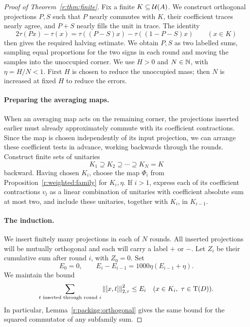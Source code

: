 \begin{proof}[Proof of Theorem~\ref{r:thm:finite}]
Fix a finite \(K\subseteq\mathcal U(A)\).
We construct orthogonal projections \(P,S\) such that \(P\) nearly commutes
with \(K\), their coefficient traces nearly agree, and \(P+S\) nearly
fills the unit in trace. The identity
\[
 2\tau(Px)-\tau(x)
 =\tau((P-S)x)-\tau((1-P-S)x)
 \qquad(x\in K)
\]
then gives the required halving estimate. We obtain \(P,S\) as two
labelled sums, sampling equal proportions for the two signs in each
round and moving the samples into the unoccupied corner.
We use \(H>0\) and \(N\in\mathbb N\), with \(\eta=H/N<1\).
First \(H\) is chosen to reduce the unoccupied mass; then \(N\) is
increased at fixed \(H\) to reduce the errors.

\paragraph{Preparing the averaging maps.}
When an averaging map acts on the remaining corner, the projections
inserted earlier must already approximately commute with its coefficient
contractions. Since the map is chosen independently of its input
projection, we can arrange these coefficient tests in advance, working
backwards through the rounds.
Construct finite sets of unitaries
\[
 K_1\supseteq K_2\supseteq\cdots\supseteq K_N=K
\]
backward. Having chosen \(K_i\), choose the map \(\Phi_i\) from
Proposition~\ref{r:weighted:family} for \(K_i,\eta\).
If \(i>1\), express each of its coefficient contractions \(v_l\) as a
linear combination of unitaries with coefficient absolute sum at most
two, and include these unitaries, together with \(K_i\), in \(K_{i-1}\).

\paragraph{The induction.}
We insert finitely many projections in each of \(N\) rounds.
All inserted projections will be mutually orthogonal and each will
carry a label \(+\) or \(-\).
Let \(Z_i\) be their cumulative sum after round \(i\), with \(Z_0=0\).
Set
\begin{equation}\label{r:eq:energy-recurrence}
 E_0=0,\qquad E_i-E_{i-1}=1000\eta(E_{i-1}+\eta).
\end{equation}
We maintain the bound
\begin{equation}\label{r:eq:energy-induction}
 \sum_{t\text{ inserted through round }i}
       \left\|[x,t]\right\|_{2,\tau}^2\leq E_i
 \quad(x\in K_i,\ \tau\in\operatorname T(D)).
\end{equation}
In particular, Lemma~\ref{r:packing:orthogonal} gives the same bound for
the squared commutator of any subfamily sum.


\end{proof}
